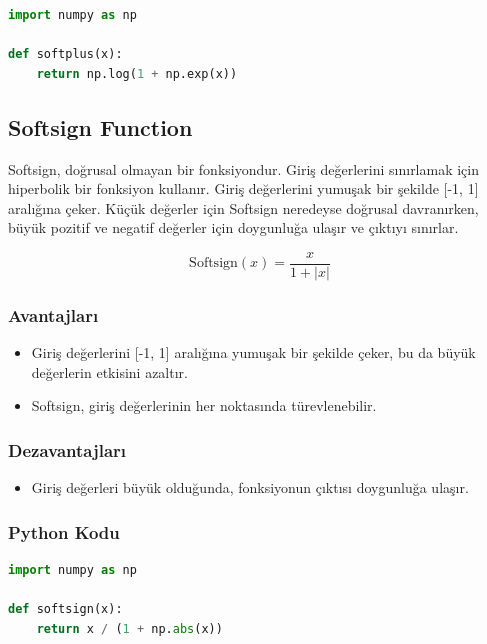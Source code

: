 \begin{lstlisting}[language=Python]
import numpy as np

def softplus(x):
    return np.log(1 + np.exp(x))
\end{lstlisting}

\newpage

\subsection{Softsign Function}

Softsign, doğrusal olmayan bir fonksiyondur. Giriş değerlerini sınırlamak için hiperbolik bir fonksiyon kullanır. Giriş değerlerini yumuşak bir şekilde [-1, 1] aralığına çeker. Küçük değerler için Softsign neredeyse doğrusal davranırken, büyük pozitif ve negatif değerler için doygunluğa ulaşır ve çıktıyı sınırlar.

\[ \text{Softsign}(x) = \frac{x}{1 + |x|} \]

\subsubsection{Avantajları}

\begin{itemize}
    \item Giriş değerlerini [-1, 1] aralığına yumuşak bir şekilde çeker, bu da büyük değerlerin etkisini azaltır.
    \item Softsign, giriş değerlerinin her noktasında türevlenebilir.
\end{itemize}

\subsubsection{Dezavantajları}

\begin{itemize}
    \item Giriş değerleri büyük olduğunda, fonksiyonun çıktısı doygunluğa ulaşır.
\end{itemize}

\subsubsection{Python Kodu}

\begin{lstlisting}[language=Python]
import numpy as np

def softsign(x):
    return x / (1 + np.abs(x))
\end{lstlisting}

